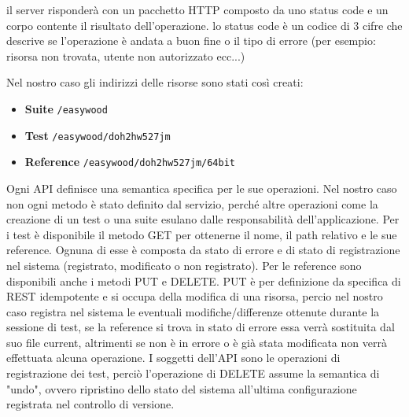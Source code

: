         il server risponderà con un pacchetto HTTP composto da uno status code e un corpo contente il risultato dell'operazione.
        lo status code è un codice di 3 cifre che descrive se l'operazione è andata a buon fine o il tipo di errore (per esempio: risorsa non trovata, utente non autorizzato ecc...)
        
        Nel nostro caso gli indirizzi delle risorse sono stati così creati: 
        \begin{itemize}
            \item \textbf{Suite} \verb|/easywood|
            \item \textbf{Test} \verb|/easywood/doh2hw527jm|
            \item \textbf{Reference} \verb|/easywood/doh2hw527jm/64bit|
        \end{itemize}
        
        Ogni API definisce una semantica specifica per le sue operazioni.
        Nel nostro caso non ogni metodo è stato definito dal servizio, perché altre operazioni come la creazione di un test o una suite esulano dalle responsabilità dell'applicazione.
        Per i test è disponibile il metodo GET per  ottenerne il nome, il path relativo e le sue reference.
        Ognuna di esse è composta da stato di errore e di stato di registrazione nel sistema (registrato, modificato o non registrato).
        Per le reference sono disponibili anche i metodi PUT e DELETE. PUT è per definizione da specifica di REST idempotente e si occupa della modifica di una risorsa, percio nel nostro caso registra nel sistema le eventuali modifiche/differenze ottenute durante la sessione di test, se la reference si trova in stato di errore essa verrà sostituita dal suo file current, altrimenti se non è in errore o è già stata modificata non verrà effettuata alcuna operazione.
        I soggetti dell'API sono le operazioni di registrazione dei test, perciò l'operazione di DELETE assume la semantica di "undo", ovvero ripristino dello stato del sistema all'ultima configurazione registrata nel controllo di versione.
        